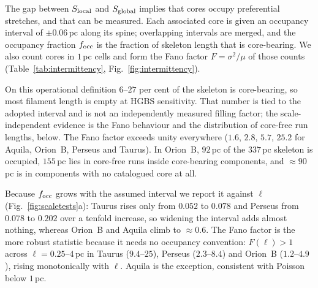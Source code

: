 \documentclass[usenatbib,twoside,twocolumn]{mnras}
\begin{document}
The gap between $S_{\rm local}$ and $S_{\rm global}$ implies that cores occupy preferential stretches, and that can be measured. Each associated core is given an occupancy interval of $\pm0.06$\,pc along its spine; overlapping intervals are merged, and the occupancy fraction $f_{\rm occ}$ is the fraction of skeleton length that is core-bearing. We also count cores in $1$\,pc cells and form the Fano factor $F=\sigma^2/\mu$ of those counts (Table~\ref{tab:intermittency}, Fig.~\ref{fig:intermittency}).

On this operational definition $6$--$27$ per cent of the skeleton is core-bearing, so most filament length is empty at HGBS sensitivity. That number is tied to the adopted interval and is not an independently measured filling factor; the scale-independent evidence is the Fano behaviour and the distribution of core-free run lengths, below. The Fano factor exceeds unity everywhere ($1.6$, $2.8$, $5.7$, $25.2$ for Aquila, Orion~B, Perseus and Taurus). In Orion~B, $92$\,pc of the $337$\,pc skeleton is occupied, $155$\,pc lies in core-free runs inside core-bearing components, and $\approx90$\,pc is in components with no catalogued core at all.

Because $f_{\rm occ}$ grows with the assumed interval we report it against $\ell$ (Fig.~\ref{fig:scaletests}a): Taurus rises only from $0.052$ to $0.078$ and Perseus from $0.078$ to $0.202$ over a tenfold increase, so widening the interval adds almost nothing, whereas Orion~B and Aquila climb to $\approx0.6$. The Fano factor is the more robust statistic because it needs no occupancy convention: $F(\ell)>1$ across $\ell=0.25$--$4$\,pc in Taurus ($9.4$--$25$), Perseus ($2.3$--$8.4$) and Orion~B ($1.2$--$4.9$), rising monotonically with $\ell$. Aquila is the exception, consistent with Poisson below $1$\,pc.
\end{document}
